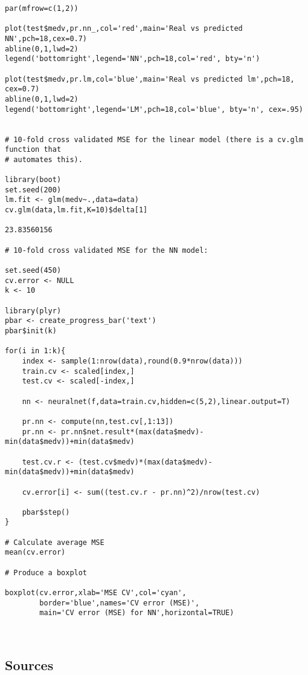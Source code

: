 \documentclass{article}
\begin{document}
\begin{verbatim}
par(mfrow=c(1,2))

plot(test$medv,pr.nn_,col='red',main='Real vs predicted NN',pch=18,cex=0.7)
abline(0,1,lwd=2)
legend('bottomright',legend='NN',pch=18,col='red', bty='n')

plot(test$medv,pr.lm,col='blue',main='Real vs predicted lm',pch=18, cex=0.7)
abline(0,1,lwd=2)
legend('bottomright',legend='LM',pch=18,col='blue', bty='n', cex=.95)


# 10-fold cross validated MSE for the linear model (there is a cv.glm function that
# automates this).

library(boot)
set.seed(200)
lm.fit <- glm(medv~.,data=data)
cv.glm(data,lm.fit,K=10)$delta[1]

23.83560156

# 10-fold cross validated MSE for the NN model:

set.seed(450)
cv.error <- NULL
k <- 10

library(plyr) 
pbar <- create_progress_bar('text')
pbar$init(k)

for(i in 1:k){
    index <- sample(1:nrow(data),round(0.9*nrow(data)))
    train.cv <- scaled[index,]
    test.cv <- scaled[-index,]
    
    nn <- neuralnet(f,data=train.cv,hidden=c(5,2),linear.output=T)
    
    pr.nn <- compute(nn,test.cv[,1:13])
    pr.nn <- pr.nn$net.result*(max(data$medv)-min(data$medv))+min(data$medv)
    
    test.cv.r <- (test.cv$medv)*(max(data$medv)-min(data$medv))+min(data$medv)
    
    cv.error[i] <- sum((test.cv.r - pr.nn)^2)/nrow(test.cv)
    
    pbar$step()
}

# Calculate average MSE
mean(cv.error)

# Produce a boxplot

boxplot(cv.error,xlab='MSE CV',col='cyan',
        border='blue',names='CV error (MSE)',
        main='CV error (MSE) for NN',horizontal=TRUE)
        
        

\end{verbatim}

\subsection{Sources}


\end{document}
